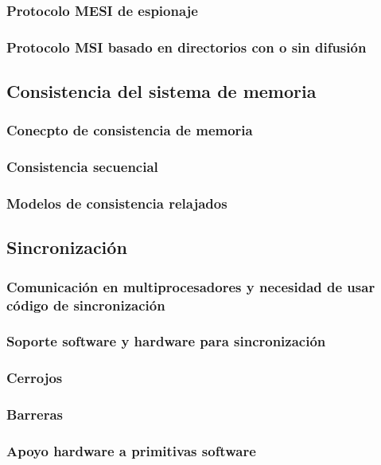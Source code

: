 \documentclass[12pt,spanish]{article}
\begin{document}
\subsubsection{Protocolo MESI de espionaje}




\subsubsection{Protocolo MSI basado en directorios con o sin difusión}






\subsection{Consistencia del sistema de memoria}

\subsubsection{Conecpto de consistencia de memoria}





\subsubsection{Consistencia secuencial}






\subsubsection{Modelos de consistencia relajados}







\subsection{Sincronización}


\subsubsection{Comunicación en multiprocesadores y necesidad de usar código de sincronización}



\subsubsection{Soporte software y hardware para sincronización}



\subsubsection{Cerrojos}



\subsubsection{Barreras}



\subsubsection{Apoyo hardware a primitivas software}
\end{document}
